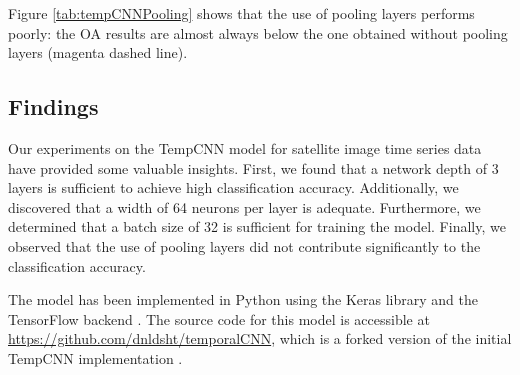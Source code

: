 Figure \ref{tab:tempCNNPooling} shows that the use of pooling layers performs poorly: the OA results are almost always
below the one obtained without pooling layers (magenta dashed line). 

\subsection{Findings}

Our experiments on the TempCNN model for satellite image time series data have provided some valuable insights. 
First, we found that a network depth of 3 layers is sufficient to achieve high classification accuracy. 
Additionally, we discovered that a width of 64 neurons per layer is adequate. 
Furthermore, we determined that a batch size of 32 is sufficient for training the model. 
Finally, we observed that the use of pooling layers did not contribute significantly to the classification accuracy.

The model has been implemented in Python using the Keras library \cite{chollet2015keras} and the TensorFlow backend \cite{tensorflow2015-whitepaper}.
The source code for this model is accessible at \url{https://github.com/dnldsht/temporalCNN}, which is a forked version of the initial TempCNN implementation \cite{tempCNN}.